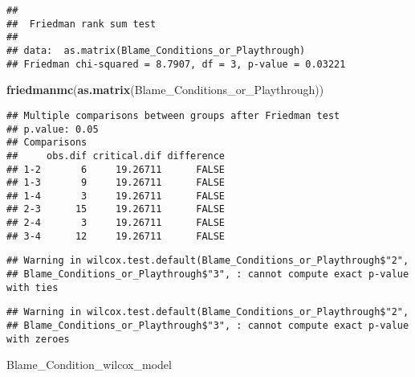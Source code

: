 \documentclass[
]{article}
\newenvironment{Shaded}{\begin{snugshade}}{\end{snugshade}}
\newcommand{\DataTypeTok}[1]{\textcolor[rgb]{0.13,0.29,0.53}{#1}}
\newcommand{\KeywordTok}[1]{\textcolor[rgb]{0.13,0.29,0.53}{\textbf{#1}}}
\newcommand{\NormalTok}[1]{#1}
\newcommand{\OperatorTok}[1]{\textcolor[rgb]{0.81,0.36,0.00}{\textbf{#1}}}
\newcommand{\OtherTok}[1]{\textcolor[rgb]{0.56,0.35,0.01}{#1}}
\newcommand{\StringTok}[1]{\textcolor[rgb]{0.31,0.60,0.02}{#1}}
\begin{document}
\begin{verbatim}
## 
##  Friedman rank sum test
## 
## data:  as.matrix(Blame_Conditions_or_Playthrough)
## Friedman chi-squared = 8.7907, df = 3, p-value = 0.03221
\end{verbatim}

\begin{Shaded}
\begin{Highlighting}[]
\KeywordTok{friedmanmc}\NormalTok{(}\KeywordTok{as.matrix}\NormalTok{(Blame_Conditions_or_Playthrough))}
\end{Highlighting}
\end{Shaded}

\begin{verbatim}
## Multiple comparisons between groups after Friedman test 
## p.value: 0.05 
## Comparisons
##     obs.dif critical.dif difference
## 1-2       6     19.26711      FALSE
## 1-3       9     19.26711      FALSE
## 1-4       3     19.26711      FALSE
## 2-3      15     19.26711      FALSE
## 2-4       3     19.26711      FALSE
## 3-4      12     19.26711      FALSE
\end{verbatim}

\begin{Shaded}
\end{Shaded}

\begin{verbatim}
## Warning in wilcox.test.default(Blame_Conditions_or_Playthrough$"2",
## Blame_Conditions_or_Playthrough$"3", : cannot compute exact p-value with ties
\end{verbatim}

\begin{verbatim}
## Warning in wilcox.test.default(Blame_Conditions_or_Playthrough$"2",
## Blame_Conditions_or_Playthrough$"3", : cannot compute exact p-value with zeroes
\end{verbatim}

\begin{Shaded}
\begin{Highlighting}[]
\NormalTok{Blame_Condition_wilcox_model}
\end{Highlighting}
\end{Shaded}
\end{document}
